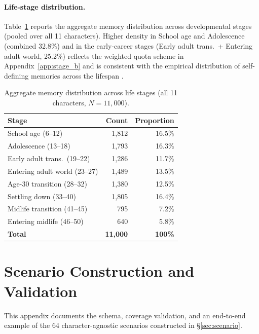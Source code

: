 \paragraph{Life-stage distribution.}
Table~\ref{tab:stage_dist} reports the aggregate memory distribution across developmental stages (pooled over all 11 characters). Higher density in School age and Adolescence (combined 32.8\%) and in the early-career stages (Early adult trans.\ + Entering adult world, 25.2\%) reflects the weighted quota scheme in Appendix~\ref{app:stage_b} and is consistent with the empirical distribution of self-defining memories across the lifespan \cite{singer1995seeing}.

\begin{table}[h]
\centering
\caption{Aggregate memory distribution across life stages (all 11 characters, $N=11{,}000$).}
\label{tab:stage_dist}
\small
\begin{tabular}{lrr}
\toprule
\textbf{Stage} & \textbf{Count} & \textbf{Proportion} \\
\midrule
School age (6--12)              & 1,812 & 16.5\% \\
Adolescence (13--18)            & 1,793 & 16.3\% \\
Early adult trans.\ (19--22)   & 1,286 & 11.7\% \\
Entering adult world (23--27)  & 1,489 & 13.5\% \\
Age-30 transition (28--32)     & 1,380 & 12.5\% \\
Settling down (33--40)         & 1,805 & 16.4\% \\
Midlife transition (41--45)    &   795 &  7.2\% \\
Entering midlife (46--50)      &   640 &  5.8\% \\
\midrule
\textbf{Total} & \textbf{11,000} & \textbf{100\%} \\
\bottomrule
\end{tabular}
\end{table}

\label{app:trait_value_dist}


\section{Scenario Construction and Validation}
\label{app:scenario}

This appendix documents the schema, coverage validation, and an end-to-end example of the 64 character-agnostic scenarios constructed in \S\ref{sec:scenario}.

